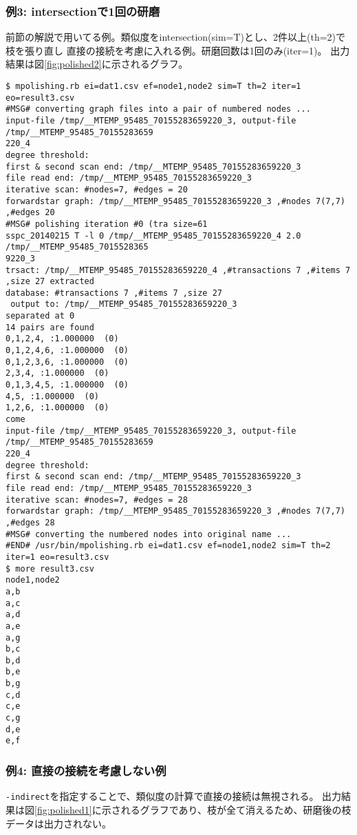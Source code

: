 \subsubsection*{例3: intersectionで1回の研磨}

前節の解説で用いてる例。類似度をintersection(sim=T)とし、2件以上(th=2)で枝を張り直し
直接の接続を考慮に入れる例。研磨回数は1回のみ(iter=1)。
出力結果は図\ref{fig:polished2}に示されるグラフ。



\begin{Verbatim}[baselinestretch=0.7,frame=single]
$ mpolishing.rb ei=dat1.csv ef=node1,node2 sim=T th=2 iter=1 eo=result3.csv
#MSG# converting graph files into a pair of numbered nodes ...
input-file /tmp/__MTEMP_95485_70155283659220_3, output-file /tmp/__MTEMP_95485_70155283659
220_4
degree threshold: 
first & second scan end: /tmp/__MTEMP_95485_70155283659220_3
file read end: /tmp/__MTEMP_95485_70155283659220_3
iterative scan: #nodes=7, #edges = 20
forwardstar graph: /tmp/__MTEMP_95485_70155283659220_3 ,#nodes 7(7,7) ,#edges 20
#MSG# polishing iteration #0 (tra size=61
sspc_20140215 T -l 0 /tmp/__MTEMP_95485_70155283659220_4 2.0 /tmp/__MTEMP_95485_7015528365
9220_3
trsact: /tmp/__MTEMP_95485_70155283659220_4 ,#transactions 7 ,#items 7 ,size 27 extracted 
database: #transactions 7 ,#items 7 ,size 27
 output to: /tmp/__MTEMP_95485_70155283659220_3
separated at 0
14 pairs are found
0,1,2,4, :1.000000  (0)
0,1,2,4,6, :1.000000  (0)
0,1,2,3,6, :1.000000  (0)
2,3,4, :1.000000  (0)
0,1,3,4,5, :1.000000  (0)
4,5, :1.000000  (0)
1,2,6, :1.000000  (0)
come
input-file /tmp/__MTEMP_95485_70155283659220_3, output-file /tmp/__MTEMP_95485_70155283659
220_4
degree threshold: 
first & second scan end: /tmp/__MTEMP_95485_70155283659220_3
file read end: /tmp/__MTEMP_95485_70155283659220_3
iterative scan: #nodes=7, #edges = 28
forwardstar graph: /tmp/__MTEMP_95485_70155283659220_3 ,#nodes 7(7,7) ,#edges 28
#MSG# converting the numbered nodes into original name ...
#END# /usr/bin/mpolishing.rb ei=dat1.csv ef=node1,node2 sim=T th=2 iter=1 eo=result3.csv
$ more result3.csv
node1,node2
a,b
a,c
a,d
a,e
a,g
b,c
b,d
b,e
b,g
c,d
c,e
c,g
d,e
e,f
\end{Verbatim}
\subsubsection*{例4: 直接の接続を考慮しない例}

\verb|-indirect|を指定することで、類似度の計算で直接の接続は無視される。
出力結果は図\ref{fig:polished1}に示されるグラフであり、枝が全て消えるため、研磨後の枝データは出力されない。


